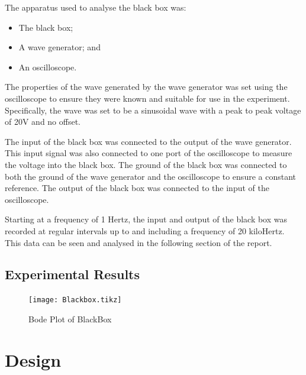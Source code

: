 \documentclass[12pt]{article} %
\begin{document}
The apparatus used to analyse the black box was:
\begin{itemize} \itemsep1pt
	\item The black box;
	\item A wave generator; and
	\item An oscilloscope.
\end{itemize}


The properties of the wave generated by the wave generator was set using the oscilloscope to ensure they were known and suitable for use in the experiment. Specifically, the wave was set to be a sinusoidal wave with a peak to peak voltage of 20V and no offset.

The input of the black box was connected to the output of the wave generator. This input signal was also connected to one port of the oscilloscope to measure the voltage into the black box. The ground of the black box was connected to both the ground of the wave generator and the oscilloscope to ensure a constant reference. The output of the black box was connected to the input of the oscilloscope. 

Starting at a frequency of 1 Hertz, the input and output of the black box was recorded at regular intervals up to and including a frequency of 20 kiloHertz. This data can be seen and analysed in the following section of the report.

\subsection{Experimental Results}

	

\begin{figure}
 	\centering
	\texttt{[image: Blackbox.tikz]}
	\caption{Bode Plot of BlackBox}
\end{figure}

\pagebreak





\section{Design}
\end{document}
